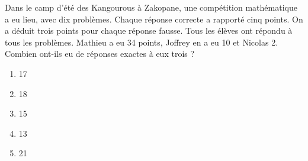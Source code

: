 Dans le camp d'été des Kangourous à Zakopane, une compétition mathématique a eu lieu, avec dix problèmes. Chaque réponse correcte a rapporté cinq points. On a déduit trois points pour chaque réponse fausse. Tous les élèves ont répondu à tous les problèmes. Mathieu a eu 34 points, Joffrey en a eu 10 et Nicolas 2. Combien ont-ils eu de réponses exactes à eux trois ?
\begin{multicols}{5}
  \begin{enumerate}[A/]
  \item 17
  \item 18
  \item 15
  \item 13
  \item 21
  \end{enumerate}
\end{multicols}